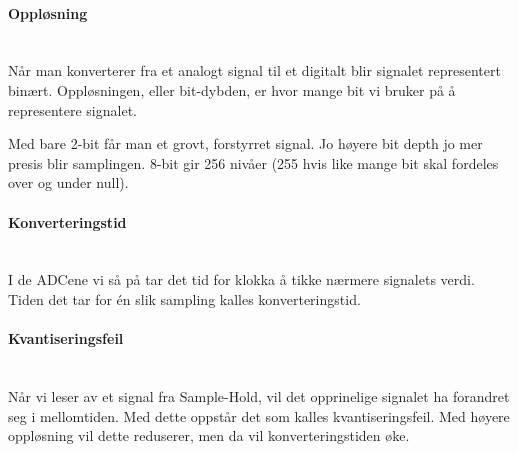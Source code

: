 \paragraph{Oppløsning} \mbox{} \\
Når man konverterer fra et analogt signal til et digitalt blir signalet
representert binært.
Oppløsningen, eller bit-dybden, er hvor mange bit vi bruker på å representere
signalet.

Med bare 2-bit får man et grovt, forstyrret signal.
Jo høyere bit depth jo mer presis blir samplingen.
8-bit gir 256 nivåer (255 hvis like mange bit skal fordeles over og under null).



\paragraph{Konverteringstid} \mbox{} \\
I de ADCene vi så på tar det tid for klokka å tikke nærmere signalets verdi.
Tiden det tar for én slik sampling kalles konverteringstid.



\paragraph{Kvantiseringsfeil} \mbox{} \\
Når vi leser av et signal fra Sample-Hold, vil det opprinelige signalet ha
forandret seg i mellomtiden.
Med dette oppstår det som kalles kvantiseringsfeil.
Med høyere oppløsning vil dette reduserer, men da vil konverteringstiden øke.
